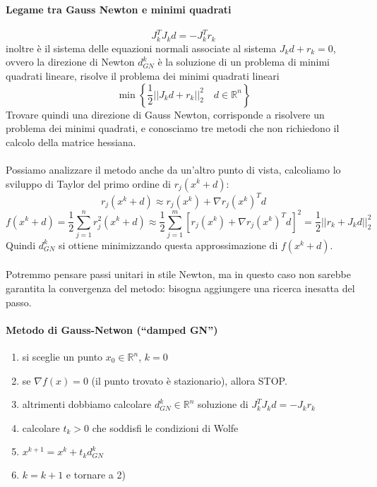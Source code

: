 \paragraph{Legame tra Gauss Newton e minimi quadrati}
$$J_{k}^{T}J_kd = - J_k^{T}r_k$$
inoltre è il sistema delle equazioni normali associate al sistema
$J_kd + r_k=0 $, ovvero la direzione di Newton $d_{GN}^{k}$ è la
soluzione di un problema di minimi quadrati lineare, risolve il
problema dei minimi quadrati lineari
$$ \min \left\{ \frac{1}{2} || J_k d + r_k ||_{2}^{2} \quad d \in \mathbb{R}^{n} \right\} $$
Trovare quindi una direzione di Gauss Newton, corrisponde
a risolvere un problema dei minimi quadrati,
e conosciamo tre metodi che non richiedono
il calcolo della matrice hessiana. \\ \\
Possiamo analizzare il metodo anche da un'altro punto di vista, calcoliamo lo sviluppo di Taylor del primo ordine di $r_j(x^{k}+ d) $:
$$ r_j(x^{k}+ d)  \approx r_j(x^{k}) + \nabla r_j(x^{k})^{T} d$$
$$ f(x^k + d) = 
\frac{1}{2} \displaystyle \sum_{j=1}^{n} r_j^{2}(x^{k} + d) \approx
 \frac{1}{2} \displaystyle \sum_{j=1}^{m}
\left[ r_j(x^{k}) + \nabla r_j(x^{k})^{T}d\right]^{2} = 
\frac{1}{2} || r_k + J_kd ||_{2}^{2} $$
Quindi $d_{GN}^{k}$ si ottiene minimizzando questa approssimazione di $f(x^k + d)$. \\ \\

Potremmo pensare passi unitari in stile Newton, ma in questo caso
non sarebbe garantita la convergenza del metodo: bisogna aggiungere
una ricerca inesatta del passo.

\paragraph{Metodo di Gauss-Netwon (``damped GN'')}
\begin{enumerate}
\item si sceglie un punto $x_0 \in \mathbb{R}^{n}$, $k=0$
\item se $\nabla f(x)=0$ (il punto trovato è stazionario),
      allora STOP.
\item altrimenti dobbiamo calcolare $d^{k}_{GN} \in \mathbb{R}^{n}$ soluzione
      di $J_{k}^{T}J_{k}d = -J_{k}r_{k}$
\item calcolare $t_k > 0 $ che soddisfi le condizioni di Wolfe
\item $x^{k+1} = x^{k} + t_k d_{GN}^{k}$
\item $k = k+1$ e tornare a 2)
\end{enumerate}

